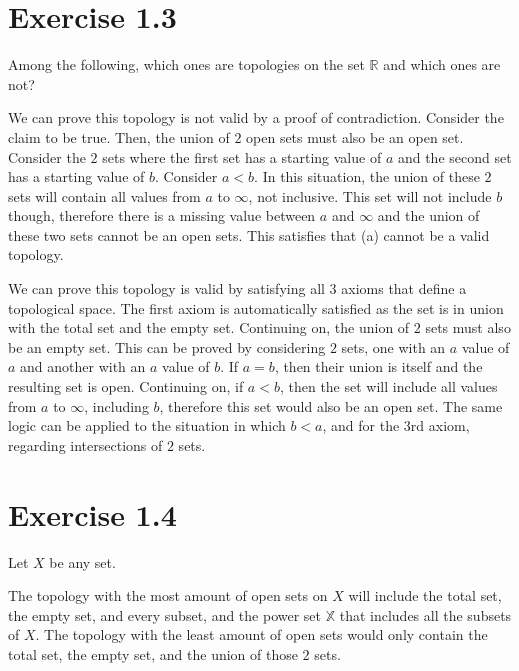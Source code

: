 \documentclass{report}
\begin{document}
\section{Exercise 1.3}
\begin{center}
    Among the following, which ones are topologies on the set $\mathbb{R}$ and which ones are not?
\end{center}
\sol We can prove this topology is not valid by a proof of contradiction. Consider the claim to be true. Then, the union of $2$ open sets must also be an open set. Consider the $2$ sets where the first set has a starting value of $a$ and the second set has a starting value of $b$. Consider $a < b$. In this situation, the union of these $2$ sets will contain all values from $a$ to $\infty$, not inclusive. This set will not include $b$ though, therefore there is a missing value between $a$ and $\infty$ and the union of these two sets cannot be an open sets. This satisfies that (a) cannot be a valid topology. 

\qs{1.3.b}{\[\tau = \{[a, \infty) \mid a \in \mathbb{R}\} \cup \{\phi, \mathbb{R}\}\].} 
\sol We can prove this topology is valid by satisfying all $3$ axioms that define a topological space. The first axiom is automatically satisfied as the set is in union with the total set and the empty set. Continuing on, the union of $2$ sets must also be an empty set. This can be proved by considering $2$ sets, one with an $a$ value of $a$ and another with an $a$ value of $b$. If $a = b$, then their union is itself and the resulting set is open. Continuing on, if $a < b$, then the set will include all values from $a$ to $\infty$, including $b$, therefore this set would also be an open set. The same logic can be applied to the situation in which $b < a$, and for the $3$rd axiom, regarding intersections of $2$ sets. 

\section{Exercise 1.4}
\begin{center}
Let $X$ be any set. 
\end{center}
\sol The topology with the most amount of open sets on $X$ will include the total set, the empty set, and every subset, and the power set $\mathbb{X}$ that includes all the subsets of $X$. 
\sol The topology with the least amount of open sets would only contain the total set, the empty set, and the union of those $2$ sets.  
\newpage
\end{document}
